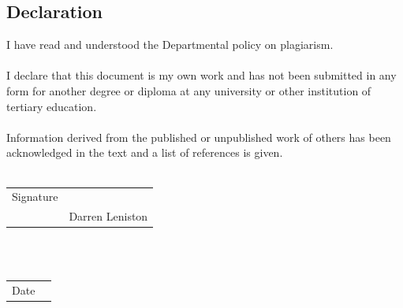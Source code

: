 \begin{center}
  \section*{Declaration}
  \label{sec:declaration}
  \thispagestyle{empty}
\end{center}

\noindent
I have read and understood the Departmental policy on plagiarism.
\\
\\
I declare that this document is my own work and has not been submitted in any form for another degree or diploma at any university or other institution of tertiary education.
\\
\\
Information derived from the published or unpublished work of others has been acknowledged in the text and a list of references is given.
\\
\\
\begin{tabular}{@{}p{.5in}p{4in}@{}}
\rowcolors{2}{white}{gray!25}
  Signature & \hrulefill \\
  & Darren Leniston \\
\end{tabular}
\\
\\
\begin{tabular}{@{}p{.5in}p{4in}@{}}
\rowcolor{white}
  Date & \hrulefill \\
\end{tabular}

